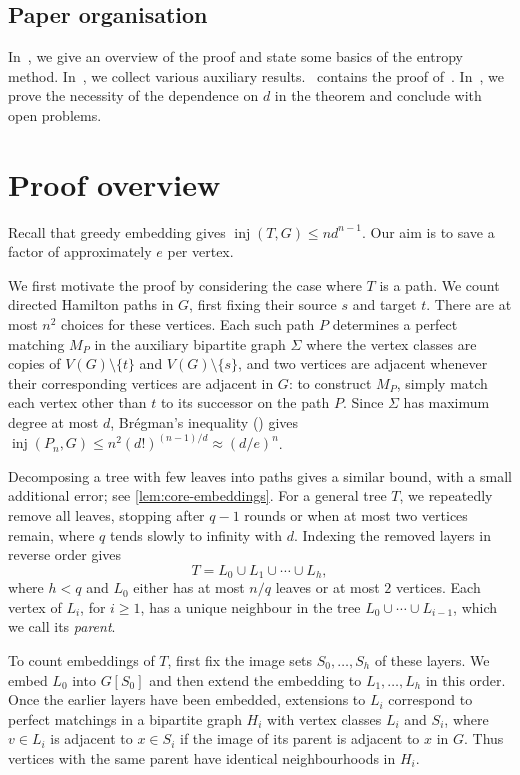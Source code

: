\documentclass[10pt,a4paper]{amsart}
\numberwithin{equation}{section}
\theoremstyle{definition}
\theoremstyle{remark}
\DeclareMathOperator{\inj}{inj}
\begin{document}
\subsection{Paper organisation}
In~, we give an overview of the proof and state some basics of the entropy method. In~, we collect various auxiliary results.~ contains the proof of~. In~, we prove the necessity of the dependence on $d$ in the theorem and conclude with open problems.


\section{Proof overview}\label{sec:overview}
Recall that greedy embedding gives $\inj(T,G)\le nd^{n-1}$.
Our aim is to save a factor of approximately $e$ per vertex.

We first motivate the proof by considering the case where $T$ is a path. We count directed Hamilton paths in $G$, first fixing their source $s$ and target $t$. There are at most $n^2$ choices for these vertices. Each such path $P$ determines a perfect matching $M_P$ in the auxiliary bipartite graph $\Sigma$ where the vertex classes are copies of $V(G)\setminus\{t\}$ and $V(G)\setminus\{s\}$, and two vertices are adjacent whenever their corresponding vertices are adjacent in $G$: to construct $M_P$, simply match each vertex other than $t$ to its successor on the path $P$. Since $\Sigma$ has maximum
degree at most $d$, Br\'egman's inequality () gives $\inj(P_n,G)\leq n^2(d!)^{(n-1)/d}\approx (d/e)^n$.

Decomposing a tree with few leaves into paths gives a similar bound, with a small additional error; see \cref{lem:core-embeddings}. For a general tree $T$, we repeatedly remove all leaves, stopping after
$q-1$ rounds or when at most two vertices remain, where $q$ tends
slowly to infinity with $d$. Indexing the removed layers in reverse order gives
\[
    T=L_0\cup L_1\cup\cdots\cup L_h,
\]
where $h<q$ and $L_0$ either has at most $n/q$ leaves or at most $2$ vertices. Each vertex of $L_i$, for $i\geq 1$, has a unique neighbour in the tree $L_0\cup\cdots\cup L_{i-1}$, which we call its \textit{parent}.


To count embeddings of $T$, first fix the image sets $S_0,\ldots,S_h$ of these layers. We embed $L_0$ into $G[S_0]$ and then extend the embedding to $L_1,\ldots,L_h$ in this order. Once the earlier layers have been embedded, extensions to $L_i$ correspond to perfect matchings in a bipartite graph $H_i$ with vertex classes $L_i$ and $S_i$, where $v\in L_i$ is adjacent to $x\in S_i$ if the image of its parent is adjacent to $x$ in $G$. Thus vertices with the same parent have identical neighbourhoods in $H_i$.
\end{document}
